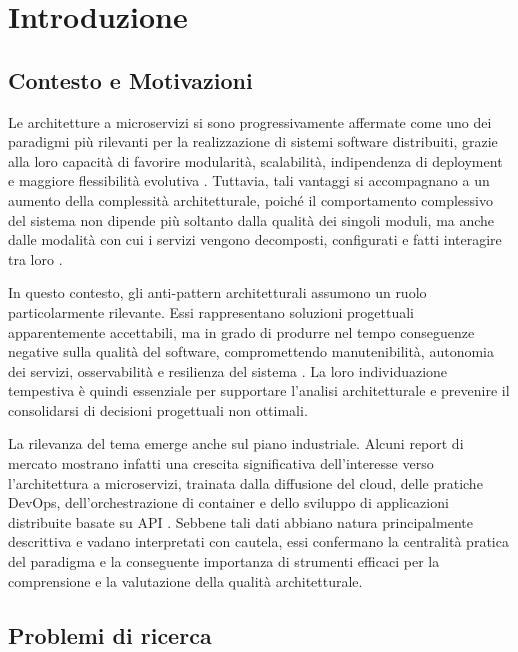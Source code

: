 \chapter{Introduzione}

\section{Contesto e Motivazioni}

Le architetture a microservizi si sono progressivamente affermate come uno dei paradigmi più rilevanti per la realizzazione di sistemi software distribuiti, grazie alla loro capacità di favorire modularità, scalabilità, indipendenza di deployment e maggiore flessibilità evolutiva \cite{CernyCatalogo, Dragoni2017}. Tuttavia, tali vantaggi si accompagnano a un aumento della complessità architetturale, poiché il comportamento complessivo del sistema non dipende più soltanto dalla qualità dei singoli moduli, ma anche dalle modalità con cui i servizi vengono decomposti, configurati e fatti interagire tra loro \cite{CernyCatalogo, Dragoni2017, Soldani2018PainsGains}.

In questo contesto, gli anti-pattern architetturali assumono un ruolo particolarmente rilevante. Essi rappresentano soluzioni progettuali apparentemente accettabili, ma in grado di produrre nel tempo conseguenze negative sulla qualità del software, compromettendo manutenibilità, autonomia dei servizi, osservabilità e resilienza del sistema \cite{CernyCatalogo}. La loro individuazione tempestiva è quindi essenziale per supportare l’analisi architetturale e prevenire il consolidarsi di decisioni progettuali non ottimali.

La rilevanza del tema emerge anche sul piano industriale. Alcuni report di mercato mostrano infatti una crescita significativa dell’interesse verso l’architettura a microservizi, trainata dalla diffusione del cloud, delle pratiche DevOps, dell’orchestrazione di container e dello sviluppo di applicazioni distribuite basate su API \cite{dati_micro}. Sebbene tali dati abbiano natura principalmente descrittiva e vadano interpretati con cautela, essi confermano la centralità pratica del paradigma e la conseguente importanza di strumenti efficaci per la comprensione e la valutazione della qualità architetturale.

\section{Problemi di ricerca}

